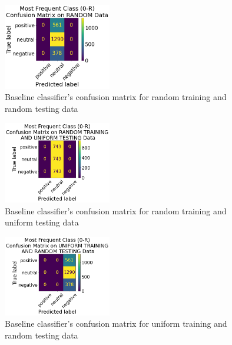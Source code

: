 \documentclass[11pt]{article}
\begin{document}
\begin{figure}[!h]
	\centering
	\includegraphics[width = 0.42\textwidth]{cf/MostFrequentClass0R-Random-confusion-matrix.png}
	\caption{Baseline classifier's confusion matrix for random training and random testing data}
	\label{fig:cf-base-rr}
\end{figure} 

\begin{figure}[!h]
	\centering
	\includegraphics[width = 0.42\textwidth]{cf/MostFrequentClass0R-RandomTrainingandUniformTesting-confusion-matrix.png}
	\caption{Baseline classifier's confusion matrix for random training and uniform testing data}
	\label{fig:cf-base-ru}
\end{figure} 

\begin{figure}[!h]
	\centering
	\includegraphics[width = 0.42\textwidth]{cf/MostFrequentClass0R-UniformTrainingandRandomTesting-confusion-matrix.png}
	\caption{Baseline classifier's confusion matrix for uniform training and random testing data}
	\label{fig:cf-base-ur}
\end{figure} 
\end{document}
